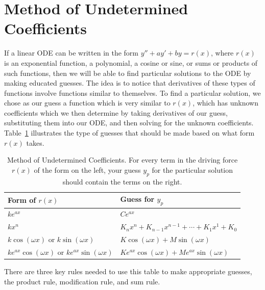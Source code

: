 \section{Method of Undetermined Coefficients}
If a linear ODE can be written in the form $y''+ay'+by=r(x)$, where $r(x)$ is an exponential function, a polynomial, a cosine or sine, or sums or products of such functions, then we will be able to find particular solutions to the ODE by making educated guesses. 
The idea is to notice that derivatives of these types of functions involve functions similar to themselves.  To find a particular solution, we chose as our guess a function which is very similar to $r(x)$, which has unknown coefficients which we then determine by taking derivatives of our guess, substituting them into our ODE, and then solving for the unknown coefficients.  Table~\ref{undeterminedcoefficient} illustrates the type of guesses that should be made based on what form $r(x)$ takes.
\begin{table}
\begin{center}
\begin{tabular}{|l|l|}
\hline
Form of $r(x)$ & Guess for $y_p$\\\hline\hline
$ke^{ax}$ & $Ce^{ax}$\\\hline
$kx^n$ & $K_n x^n + K_{n-1}x^{n-1}+\cdots+K_1 x^1 +K_0$\\\hline
$k\cos(\omega x)$ or $k\sin(\omega x)$ & $K\cos(\omega x)+M\sin(\omega x)$\\\hline
$ke^{ax}\cos(\omega x)$ or $ke^{ax}\sin(\omega x)$ & $Ke^{ax}\cos(\omega x)+Me^{ax}\sin(\omega x)$\\\hline
\end{tabular}
\caption{Method of Undetermined Coefficients. For every term in the driving force $r(x)$ of the form on the left, your guess $y_p$ for the particular solution should contain the terms on the right.}
\label{undeterminedcoefficient}
\end{center}
\end{table}
There are three key rules needed to use this table to make appropriate guesses, the product rule, modification rule, and sum rule. 
